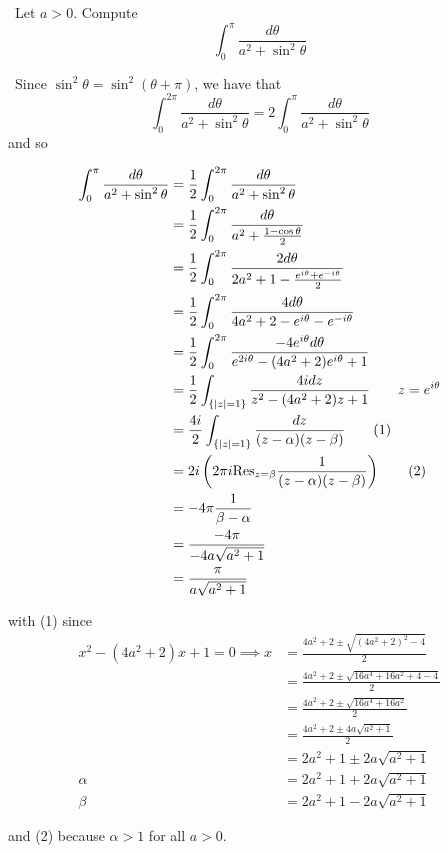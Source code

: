 \documentclass[12pt]{Qual}
\begin{document}
\begin{problem} $\,$
Let $a>0$. Compute $$\int_0^\pi\frac{d\theta}{a^2+\sin^2\theta}$$
\end{problem}


\begin{solution}$\,$
Since $\sin^2\theta=\sin^2(\theta+\pi)$, we have that $$\int_0^{2\pi}\frac{d\theta}{a^2+\sin^2\theta}=2\int_0^\pi\frac{d\theta}{a^2+\sin^2\theta}$$ and so

\begin{align*}
    \int_0^\pi\frac{d\theta}{a^2+\sin^2\theta}&=\frac{1}{2}\int_0^{2\pi}\frac{d\theta}{a^2+\sin^2\theta}\\
    &=\frac{1}{2}\int_0^{2\pi}\frac{d\theta}{a^2+\frac{1-\cos\theta}{2}}\\
    &=\frac{1}{2}\int_0^{2\pi}\frac{2d\theta}{2a^2+1-\frac{e^{i\theta}+e^{-i\theta}}{2}}\\
    &=\frac{1}{2}\int_0^{2\pi}\frac{4d\theta}{4a^2+2-e^{i\theta}-e^{-i\theta}}\\
    &=\frac{1}{2}\int_0^{2\pi}\frac{-4e^{i\theta}d\theta}{e^{2i\theta}-(4a^2+2)e^{i\theta}+1}\\
    &=\frac{1}{2}\int_{\{|z|=1\}}\frac{4idz}{z^2-(4a^2+2)z+1}\qquad z=e^{i\theta}\\
    &=\frac{4i}{2}\int_{\{|z|=1\}}\frac{dz}{(z-\alpha)(z-\beta)}\tag{1}\\
    &=2i\left(2\pi i\text{Res}_{z=\beta}\frac{1}{(z-\alpha)(z-\beta)}\right)\tag{2}\\
    &=-4\pi\frac{1}{\beta-\alpha}\\
    &=\frac{-4\pi}{-4a\sqrt{a^2+1}}\\
    &=\frac{\pi}{a\sqrt{a^2+1}}\\
\end{align*}

with (1) since \begin{align*}
    x^2-(4a^2+2)x+1=0\implies x&=\frac{4a^2+2\pm\sqrt{(4a^2+2)^2-4}}{2}\\
    &=\frac{4a^2+2\pm\sqrt{16a^4+16a^2+4-4}}{2}\\
    &=\frac{4a^2+2\pm\sqrt{16a^4+16a^2}}{2}\\
    &=\frac{4a^2+2\pm4a\sqrt{a^2+1}}{2}\\
    &=2a^2+1\pm2a\sqrt{a^2+1}\\
    \alpha&=2a^2+1+2a\sqrt{a^2+1}\\
    \beta&=2a^2+1-2a\sqrt{a^2+1}
\end{align*}

and (2) because $\alpha>1$ for all $a>0$.
\end{solution}
\newpage
\end{document}
